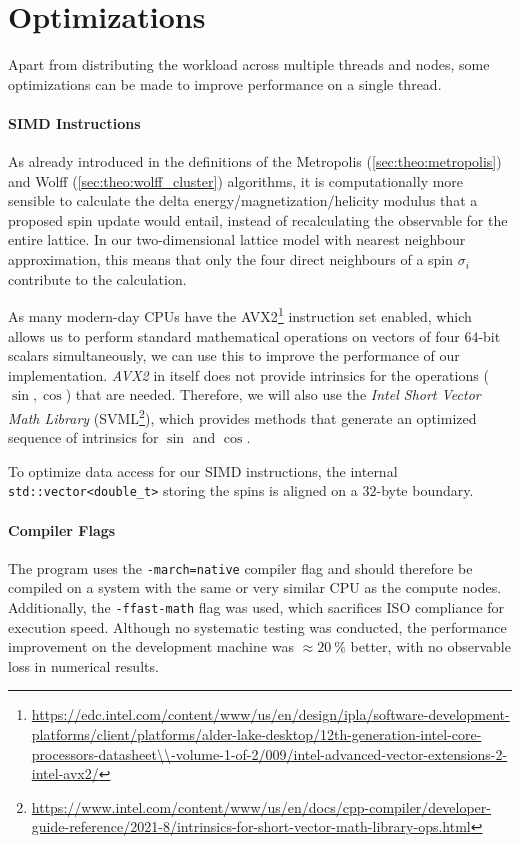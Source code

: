 \section{Optimizations}\label{sec:impl:optimizations}
	Apart from distributing the workload across multiple threads and nodes, some optimizations can be made to improve performance on a single thread.
	
	\paragraph{SIMD Instructions}\label{sec:impl:optimizations:simd}
		As already introduced in the definitions of the Metropolis (\cref{sec:theo:metropolis}) and Wolff (\cref{sec:theo:wolff_cluster}) algorithms, it is computationally more sensible to calculate the delta energy/magnetization/helicity modulus that a proposed spin update would entail, instead of recalculating the observable for the entire lattice. In our two-dimensional lattice model with nearest neighbour approximation, this means that only the four direct neighbours of a spin $\sigma_i$ contribute to the calculation.
			
		As many modern-day CPUs have the AVX2\footnote{\url{https://edc.intel.com/content/www/us/en/design/ipla/software-development-platforms/client/platforms/alder-lake-desktop/12th-generation-intel-core-processors-datasheet\\-volume-1-of-2/009/intel-advanced-vector-extensions-2-intel-avx2/}} instruction set enabled, which allows us to perform standard mathematical operations on vectors of four $64$-bit scalars simultaneously, we can use this to improve the performance of our implementation. \emph{AVX2} in itself does not provide intrinsics for the operations ($\sin, \cos$) that are needed. Therefore, we will also use the \emph{Intel\textsuperscript{\tiny\textregistered} Short Vector Math Library} (SVML\footnote{\url{https://www.intel.com/content/www/us/en/docs/cpp-compiler/developer-guide-reference/2021-8/intrinsics-for-short-vector-math-library-ops.html}}), which provides methods that generate an optimized sequence of intrinsics for $\sin$ and $\cos$.
		
		To optimize data access for our SIMD instructions, the internal \texttt{std::vector<double_t>} storing the spins is aligned on a $32$-byte boundary.
		
	\paragraph{Compiler Flags}
		The program uses the \texttt{-march=native} compiler flag and should therefore be compiled on a system with the same or very similar CPU as the compute nodes. Additionally, the \texttt{-ffast-math} flag was used, which sacrifices ISO compliance for execution speed. Although no systematic testing was conducted, the performance improvement on the development machine was $\approx \SI{20}{\percent}$ better, with no observable loss in numerical results. 
	
